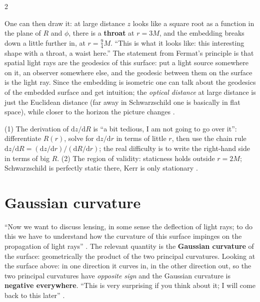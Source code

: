 \begin{paracol}{2}
\begin{enumerate}
\end{enumerate}
One can then draw it: at large distance $z$ looks like a square root as a function in the plane of $R$ and $\phi$, there is a \textbf{throat} at $r=3M$, and the embedding breaks down a little further in, at $r=\tfrac94M$. ``This is what it looks like: this interesting shape with a throat, a waist here.'' The statement from Fermat's principle is that spatial light rays are the geodesics of this surface: put a light source somewhere on it, an observer somewhere else, and the geodesic between them on the surface is the light ray. Since the embedding is isometric one can talk about the geodesics of the embedded surface and get intuition; the \emph{optical distance} at large distance is just the Euclidean distance (far away in Schwarzschild one is basically in flat space), while closer to the horizon the picture changes .
\begin{coursenote}
(1) The derivation of $\mathrm dz/\mathrm dR$ is ``a bit tedious, I am not going to go over it'': differentiate $R(r)$, solve for $\mathrm dz/\mathrm dr$ in terms of little $r$, then use the chain rule $\mathrm dz/\mathrm dR=(\mathrm dz/\mathrm dr)/(\mathrm dR/\mathrm dr)$; the real difficulty is to write the right-hand side in terms of big $R$. (2) The region of validity: staticness holds outside $r=2M$; Schwarzschild is perfectly static there, Kerr is only stationary .
\end{coursenote}

\section{Gaussian curvature}\label{sec:c16-gauss}

``Now we want to discuss lensing, in some sense the deflection of light rays; to do this we have to understand how the curvature of this surface impinges on the propagation of light rays'' . The relevant quantity is the \textbf{Gaussian curvature} of the surface: geometrically the product of the two principal curvatures. Looking at the surface above: in one direction it curves in, in the other direction out, so the two principal curvatures have \emph{opposite sign} and the Gaussian curvature is \textbf{negative everywhere}. ``This is very surprising if you think about it; I will come back to this later'' .


\end{paracol}
